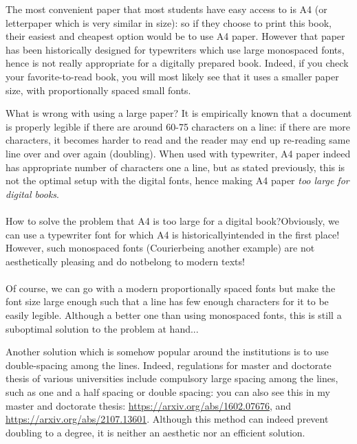 The most convenient paper that most students have easy access to is A4 (or letterpaper which is very similar in size): so if they choose to print this book, their easiest and cheapest option would be to use A4 paper. However that paper has been historically designed for typewriters which use large monospaced fonts, hence is not really appropriate for a digitally prepared book. Indeed, if you check your favorite-to-read book, you will most likely see that it uses a smaller paper size, with proportionally spaced small fonts.

\beginfullwidth
\begin{SingleSpace}
\hphantom{\indent} What is wrong with using a large paper? It is empirically known that a document is properly legible if there are around 60-75 characters on a line: if there are more characters, it becomes harder to read and the reader may end up re-reading same line over and over again (doubling). When used with typewriter, A4 paper indeed has appropriate number of characters one a line, but as stated previously, this is not the optimal setup with the digital fonts, hence making A4 paper \emph{too large for digital books}.
\\\\
{\ttfamily \hphantom{\indent} How to solve the problem that A4 is too large for a digital book?\newline Obviously, we can use a typewriter font for which A4 is historically\newline intended in the first place! However, such monospaced fonts (Courier\newline being another example) are not aesthetically pleasing and do not\newline belong to modern texts!}
\\\\
{\LARGE \hphantom{\indent} Of course, we can go with a modern proportionally spaced fonts but make the font size large enough such that a line has few enough characters for it to be easily legible. Although a better one than using monospaced fonts, this is still a suboptimal solution to the problem at hand...}
\end{SingleSpace}
%
\begin{DoubleSpace}
	Another solution which is somehow popular around the institutions is to use double-spacing among the lines. Indeed, regulations for master and doctorate thesis of various universities include compulsory large spacing among the lines, such as one and a half spacing or double spacing: you can also see this in my master and doctorate thesis: \href{https://arxiv.org/abs/1602.07676}{https://arxiv.org/abs/1602.07676}, and \href{https://arxiv.org/abs/2107.13601}{https://arxiv.org/abs/2107.13601}. Although this method can indeed prevent doubling to a degree, it is neither an aesthetic nor an efficient solution.
\end{DoubleSpace}

